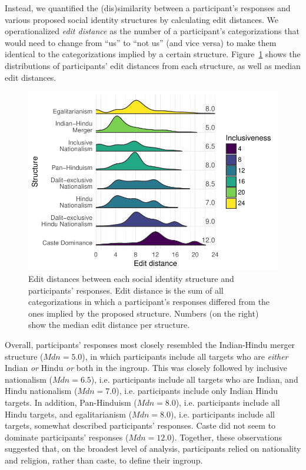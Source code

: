 \documentclass[12pt, a4paper]{article}
\begin{document}
Instead, we quantified the (dis)similarity between a participant's responses and various proposed social identity structures by calculating edit distances. We operationalized \emph{edit distance} as the number of a participant's categorizations that would need to change from ``us'' to ``not us'' (and vice versa) to make them identical to the categorizations implied by a certain structure. Figure~\ref{fig:c-1} shows the distributions of participants' edit distances from each structure, as well as median edit distances. 

\begin{figure}
\centering
\includegraphics[scale=1]{../figures/appendices/appendices-b-1}
\caption[Edit distances between social identity structures and participants' responses]{Edit distances between each social identity structure and participants' responses. Edit distance is the sum of all categorizations in which a participant's responses differed from the ones implied by the proposed structure. Numbers (on the right) show the median edit distance per structure. %
}
\label{fig:c-1}
\end{figure}

Overall, participants' responses most closely resembled the Indian-Hindu merger structure ($\textit{Mdn} = 5.0$), in which participants include all targets who are \emph{either} Indian \emph{or} Hindu \emph{or} both in the ingroup. This was closely followed by inclusive nationalism ($\textit{Mdn} = 6.5$), i.e. participants include all targets who are Indian, and Hindu nationalism ($\textit{Mdn} = 7.0$), i.e. participants include only Indian Hindu targets. In addition, Pan-Hinduism ($\textit{Mdn} = 8.0$), i.e. participants include all Hindu targets, and egalitarianism ($\textit{Mdn} = 8.0$), i.e. participants include all targets, somewhat described participants' responses. Caste did not seem to dominate participants' responses ($\textit{Mdn} = 12.0$). Together, these observations suggested that, on the broadest level of analysis, participants relied on nationality and religion, rather than caste, to define their ingroup.
\end{document}
